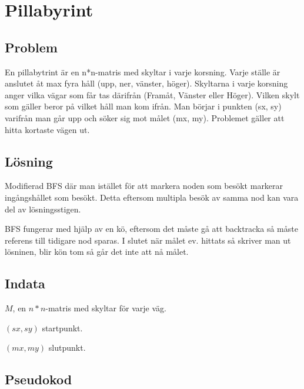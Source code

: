 \documentclass[a4paper,10pt,twoside]{article}
\begin{document}
\pagebreak
\section{Pillabyrint}

\subsection{Problem}

En pillabytrint är en n*n-matris med skyltar i varje korsning. Varje ställe är anslutet åt max fyra håll (upp, ner, vänster, höger). Skyltarna i varje korsning anger vilka vägar som får tas därifrån (Framåt, Vänster eller Höger). Vilken skylt som gäller beror på vilket håll man kom ifrån. Man börjar i punkten (sx, sy) varifrån man går upp och söker sig mot målet (mx, my). Problemet gäller att hitta kortaste vägen ut.

\subsection{Lösning}

Modifierad BFS där man istället för att markera noden som besökt markerar ingångshållet som besökt. Detta eftersom multipla besök av samma nod kan vara del av lösningsstigen.

BFS fungerar med hjälp av en kö, eftersom det måste gå att backtracka så måste referens till tidigare nod sparas. I slutet när målet ev. hittats så skriver man ut lösninen, blir kön tom så går det inte att nå målet.

\subsection{Indata}

$M$, en $n*n$-matris med skyltar för varje väg.

$(sx, sy)$ startpunkt.

$(mx, my)$ slutpunkt.

\subsection{Pseudokod}
\end{document}
